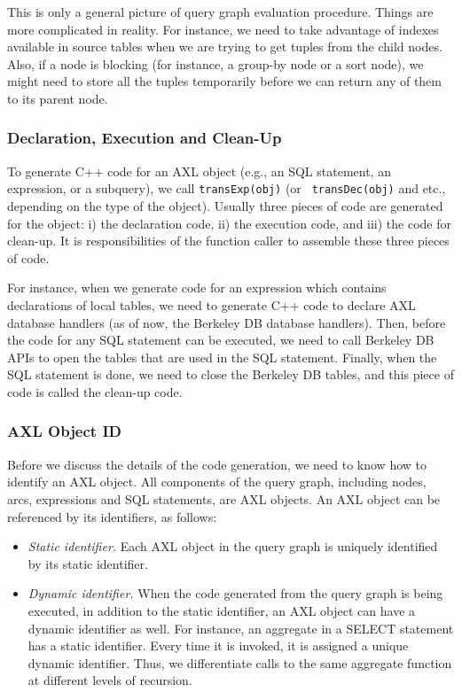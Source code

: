 This is only a general picture of query graph evaluation procedure.
Things are more complicated in reality. For instance, we need to take
advantage of indexes available in source tables when we are trying to
get tuples from the child nodes. Also, if a node is blocking (for
instance, a group-by node or a sort node), we might need to store all
the tuples temporarily before we can return any of them to its parent
node.

\subsubsection*{Declaration, Execution and Clean-Up}
To generate C++ code for an AXL object (e.g., an SQL statement, an
expression, or a subquery), we call {\tt transExp(obj)} (or {\tt
  transDec(obj)} and etc., depending on the type of the object).
Usually three pieces of code are generated for the object: i) the
declaration code, ii) the execution code, and iii) the code for
clean-up.  It is responsibilities of the function caller to assemble
these three pieces of code.

For instance, when we generate code for an expression which contains
declarations of local tables, we need to generate C++ code to declare
AXL database handlers (as of now, the Berkeley DB database handlers).
Then, before the code for any SQL statement can be executed, we need
to call Berkeley DB APIs to open the tables that are used in the SQL
statement. Finally, when the SQL statement is done, we need to close
the Berkeley DB tables, and this piece of code is called the clean-up
code.

\subsubsection*{AXL Object ID}
Before we discuss the details of the code generation, we need to know
how to identify an AXL object. All components of the query graph,
including nodes, arcs, expressions and SQL statements, are AXL
objects.  An AXL object can be referenced by its identifiers, as
follows:

\begin{itemize}
\item {\it Static identifier.} Each AXL object in the query graph is
  uniquely identified by its static identifier.
\item {\it Dynamic identifier.} When the code generated from the query
  graph is being executed, in addition to the static identifier, an
  AXL object can have a dynamic identifier as well. For instance, an
  aggregate in a SELECT statement has a static identifier.  Every time
  it is invoked, it is assigned a unique dynamic identifier.  Thus, we
  differentiate calls to the same aggregate function at different
  levels of recursion.
\end{itemize}


